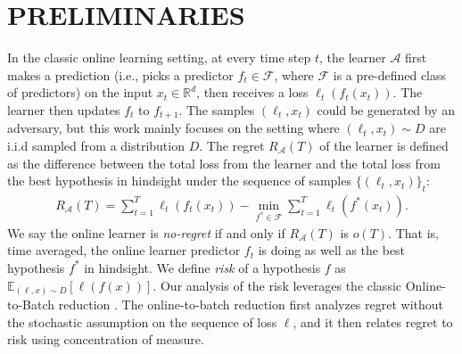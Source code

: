 


\section{PRELIMINARIES}
\label{sec:sgb_preliminaries}
In the classic online learning setting, at every time step $t$, the learner $\mathcal{A}$ first makes a prediction (i.e., picks a predictor $f_t \in\mathcal{F}$, where $\mathcal{F}$ is a pre-defined class of predictors) on the input  $x_t\in\mathbb{R}^d$, then receives a loss $\ell_t(f_t(x_t))$. The learner then updates $f_t$ to $f_{t+1}$. The samples $(\ell_t,x_t)$ could be generated by an adversary, but this work mainly focuses on the setting where $(\ell_t,x_t)\sim D$ are i.i.d sampled from a distribution $D$.
The regret $R_{\mathcal{A}}(T)$ of the learner is defined as the difference between the total loss from the learner and the total loss from the best hypothesis in hindsight under the sequence of samples  $\{ (\ell_t, x_t) \}_t$:
\begin{align}
    R_{\mathcal{A}}(T) = \sum_{t=1}^T \ell_t(f_t(x_t)) - \min_{f^*\in\mathcal{F}}\sum_{t=1}^T\ell_t(f^*(x_t)).
\end{align} 
We say the online learner is \emph{no-regret} if and only if $R_{\mathcal{A}}(T)$ is $o(T)$. That is, time averaged, the online learner predictor $f_t$ is doing as well as the best hypothesis $f^*$ in hindsight. 
We define \emph{risk} of a hypothesis $f$ as $\mathbb{E}_{(\ell, x)\sim D}[\ell(f(x))]$. Our analysis of the risk leverages the classic Online-to-Batch reduction \citep{cesa2004generalization,JMLR:v15:hazan14a}. The online-to-batch reduction first analyzes  regret without the stochastic assumption on the sequence of loss $\ell$, and it then relates  regret to  risk using concentration of measure. 

